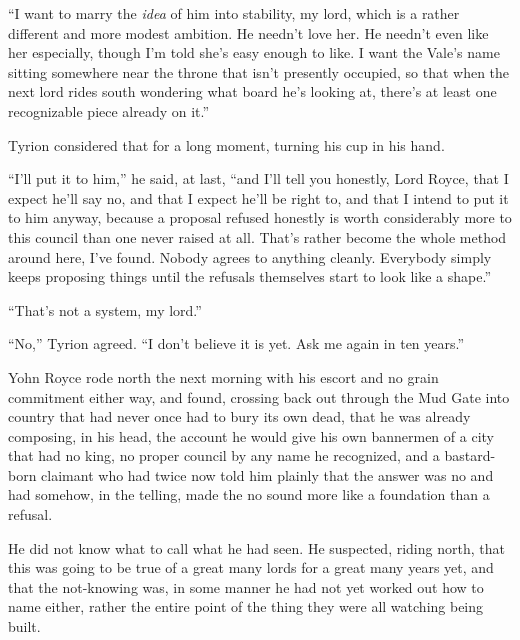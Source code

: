 “I want to marry the \textit{idea} of him into stability, my lord, which is a rather different and more modest ambition. He needn’t love her. He needn’t even like her especially, though I’m told she’s easy enough to like. I want the Vale’s name sitting somewhere near the throne that isn’t presently occupied, so that when the next lord rides south wondering what board he’s looking at, there’s at least one recognizable piece already on it.”

Tyrion considered that for a long moment, turning his cup in his hand.

“I’ll put it to him,” he said, at last, “and I’ll tell you honestly, Lord Royce, that I expect he’ll say no, and that I expect he’ll be right to, and that I intend to put it to him anyway, because a proposal refused honestly is worth considerably more to this council than one never raised at all. That’s rather become the whole method around here, I’ve found. Nobody agrees to anything cleanly. Everybody simply keeps proposing things until the refusals themselves start to look like a shape.”

“That’s not a system, my lord.”

“No,” Tyrion agreed. “I don’t believe it is yet. Ask me again in ten years.”

\sceneBreak

Yohn Royce rode north the next morning with his escort and no grain commitment either way, and found, crossing back out through the Mud Gate into country that had never once had to bury its own dead, that he was already composing, in his head, the account he would give his own bannermen of a city that had no king, no proper council by any name he recognized, and a bastard-born claimant who had twice now told him plainly that the answer was no and had somehow, in the telling, made the no sound more like a foundation than a refusal.

He did not know what to call what he had seen. He suspected, riding north, that this was going to be true of a great many lords for a great many years yet, and that the not-knowing was, in some manner he had not yet worked out how to name either, rather the entire point of the thing they were all watching being built.